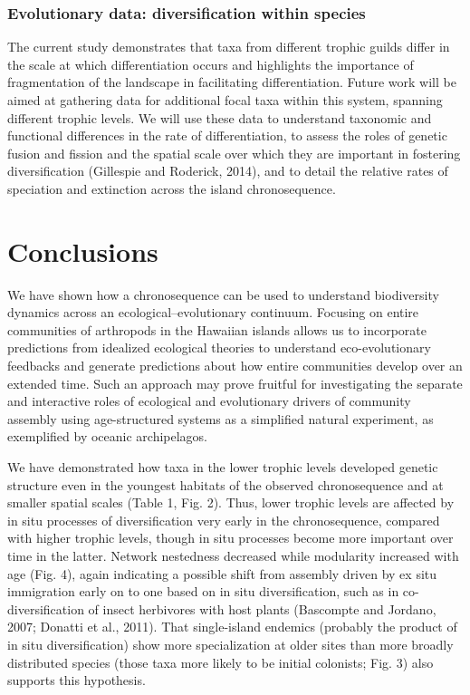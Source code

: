 \subsubsection{Evolutionary data: diversification within species} The
current study demonstrates that taxa from different trophic guilds
differ in the scale at which differentiation occurs and highlights the
importance of fragmentation of the landscape in facilitating
differentiation. Future work will be aimed at gathering data for
additional focal taxa within this system, spanning different trophic
levels. We will use these data to understand taxonomic and functional
differences in the rate of differentiation, to assess the roles of
genetic fusion and fission and the spatial scale over which they are
important in fostering diversification (Gillespie and Roderick, 2014),
and to detail the relative rates of speciation and extinction across
the island chronosequence.


\section{Conclusions}

We have shown how a chronosequence can be used to understand
biodiversity dynamics across an ecological–evolutionary
continuum. Focusing on entire communities of arthropods in the
Hawaiian islands allows us to incorporate predictions from idealized
ecological theories to understand eco-evolutionary feedbacks and
generate predictions about how entire communities develop over an
extended time. Such an approach may prove fruitful for investigating
the separate and interactive roles of ecological and evolutionary
drivers of community assembly using age-structured systems as a
simplified natural experiment, as exemplified by oceanic archipelagos.

We have demonstrated how taxa in the lower trophic levels developed
genetic structure even in the youngest habitats of the observed
chronosequence and at smaller spatial scales (Table 1, Fig. 2). Thus,
lower trophic levels are affected by in situ processes of
diversification very early in the chronosequence, compared with higher
trophic levels, though in situ processes become more important over
time in the latter. Network nestedness decreased while modularity
increased with age (Fig. 4), again indicating a possible shift from
assembly driven by ex situ immigration early on to one based on in
situ diversification, such as in co-diversification of insect
herbivores with host plants (Bascompte and Jordano, 2007; Donatti et
al., 2011). That single-island endemics (probably the product of in
situ diversification) show more specialization at older sites than
more broadly distributed species (those taxa more likely to be initial
colonists; Fig. 3) also supports this hypothesis.

